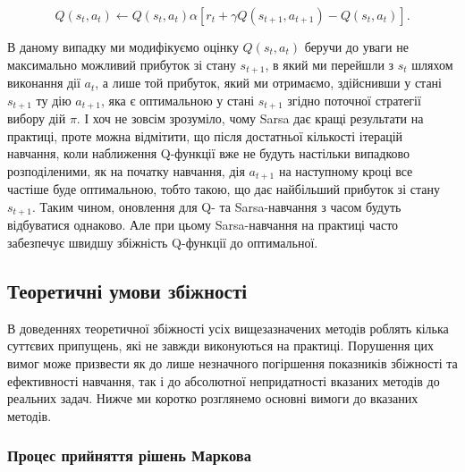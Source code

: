 \documentclass[a4paper,10pt,fleqn]{article}
\begin{document}
\begin{equation}
Q(s_t,a_t) \leftarrow Q(s_t,a_t)  \alpha \left[ r_t + \gamma Q(s_{t+1}, a_{t+1}) - Q(s_t, a_t) \right].
\end{equation}

В даному випадку ми модифікуємо оцінку $Q(s_t,a_t)$ беручи до уваги не максимально можливий прибуток зі стану $s_{t+1}$, в який ми перейшли з $s_t$ шляхом виконання дії $a_t$, а лише той прибуток, який ми отримаємо, здійснивши у стані $s_{t+1}$ ту дію $a_{t+1}$, яка є оптимальною у стані $s_{t+1}$ згідно поточної стратегії вибору дій $\pi$. І хоч не зовсім зрозуміло, чому Sarsa дає кращі результати на практиці, проте можна відмітити, що після достатньої кількості ітерацій навчання, коли наближення Q-функції вже не будуть настільки випадково розподіленими, як на початку навчання, дія $a_{t+1}$ на наступному кроці все частіше буде оптимальною, тобто такою, що дає найбільший прибуток зі стану $s_{t+1}$. Таким чином, оновлення для Q- та Sarsa-навчання з часом будуть відбуватися однаково. Але при цьому Sarsa-навчання на практиці часто забезпечує швидшу збіжність Q-функції до оптимальної.

\subsection{Теоретичні умови збіжності}

В доведеннях теоретичної збіжності усіх вищезазначених методів роблять кілька суттєвих припущень, які не завжди виконуються на практиці. Порушення цих вимог може призвести як до лише незначного погіршення показників збіжності та ефективності навчання, так і до абсолютної непридатності вказаних методів до реальних задач. Нижче ми коротко розглянемо основні вимоги до вказаних методів.

\subsubsection{Процес прийняття рішень Маркова}
\end{document}
